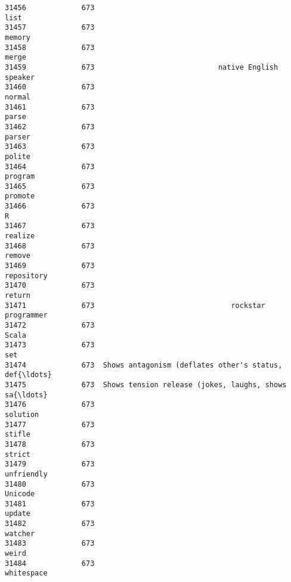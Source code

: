 \documentclass[11pt]{article}
\begin{document}
\begin{Verbatim}[commandchars=\\\{\}]
31456             673                                               list   
31457             673                                             memory   
31458             673                                              merge   
31459             673                             native English speaker   
31460             673                                             normal   
31461             673                                              parse   
31462             673                                             parser   
31463             673                                             polite   
31464             673                                            program   
31465             673                                            promote   
31466             673                                                  R   
31467             673                                            realize   
31468             673                                             remove   
31469             673                                         repository   
31470             673                                             return   
31471             673                                rockstar programmer   
31472             673                                              Scala   
31473             673                                                set   
31474             673  Shows antagonism (deflates other's status, def{\ldots}   
31475             673  Shows tension release (jokes, laughs, shows sa{\ldots}   
31476             673                                           solution   
31477             673                                             stifle   
31478             673                                             strict   
31479             673                                         unfriendly   
31480             673                                            Unicode   
31481             673                                             update   
31482             673                                            watcher   
31483             673                                              weird   
31484             673                                         whitespace   


\end{Verbatim}
\end{document}
